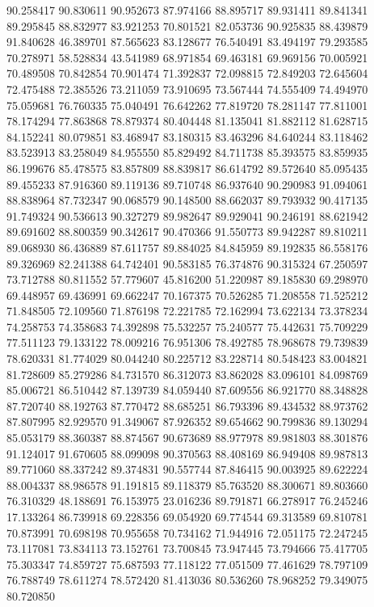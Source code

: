 90.258417
90.830611
90.952673
87.974166
88.895717
89.931411
89.841341
89.295845
88.832977
83.921253
70.801521
82.053736
90.925835
88.439879
91.840628
46.389701
87.565623
83.128677
76.540491
83.494197
79.293585
70.278971
58.528834
43.541989
68.971854
69.463181
69.969156
70.005921
70.489508
70.842854
70.901474
71.392837
72.098815
72.849203
72.645604
72.475488
72.385526
73.211059
73.910695
73.567444
74.555409
74.494970
75.059681
76.760335
75.040491
76.642262
77.819720
78.281147
77.811001
78.174294
77.863868
78.879374
80.404448
81.135041
81.882112
81.628715
84.152241
80.079851
83.468947
83.180315
83.463296
84.640244
83.118462
83.523913
83.258049
84.955550
85.829492
84.711738
85.393575
83.859935
86.199676
85.478575
83.857809
88.839817
86.614792
89.572640
85.095435
89.455233
87.916360
89.119136
89.710748
86.937640
90.290983
91.094061
88.838964
87.732347
90.068579
90.148500
88.662037
89.793932
90.417135
91.749324
90.536613
90.327279
89.982647
89.929041
90.246191
88.621942
89.691602
88.800359
90.342617
90.470366
91.550773
89.942287
89.810211
89.068930
86.436889
87.611757
89.884025
84.845959
89.192835
86.558176
89.326969
82.241388
64.742401
90.583185
76.374876
90.315324
67.250597
73.712788
80.811552
57.779607
45.816200
51.220987
89.185830
69.298970
69.448957
69.436991
69.662247
70.167375
70.526285
71.208558
71.525212
71.848505
72.109560
71.876198
72.221785
72.162994
73.622134
73.378234
74.258753
74.358683
74.392898
75.532257
75.240577
75.442631
75.709229
77.511123
79.133122
78.009216
76.951306
78.492785
78.968678
79.739839
78.620331
81.774029
80.044240
80.225712
83.228714
80.548423
83.004821
81.728609
85.279286
84.731570
86.312073
83.862028
83.096101
84.098769
85.006721
86.510442
87.139739
84.059440
87.609556
86.921770
88.348828
87.720740
88.192763
87.770472
88.685251
86.793396
89.434532
88.973762
87.807995
82.929570
91.349067
87.926352
89.654662
90.799836
89.130294
85.053179
88.360387
88.874567
90.673689
88.977978
89.981803
88.301876
91.124017
91.670605
88.099098
90.370563
88.408169
86.949408
89.987813
89.771060
88.337242
89.374831
90.557744
87.846415
90.003925
89.622224
88.004337
88.986578
91.191815
89.118379
85.763520
88.300671
89.803660
76.310329
48.188691
76.153975
23.016236
89.791871
66.278917
76.245246
17.133264
86.739918
69.228356
69.054920
69.774544
69.313589
69.810781
70.873991
70.698198
70.955658
70.734162
71.944916
72.051175
72.247245
73.117081
73.834113
73.152761
73.700845
73.947445
73.794666
75.417705
75.303347
74.859727
75.687593
77.118122
77.051509
77.461629
78.797109
76.788749
78.611274
78.572420
81.413036
80.536260
78.968252
79.349075
80.720850
